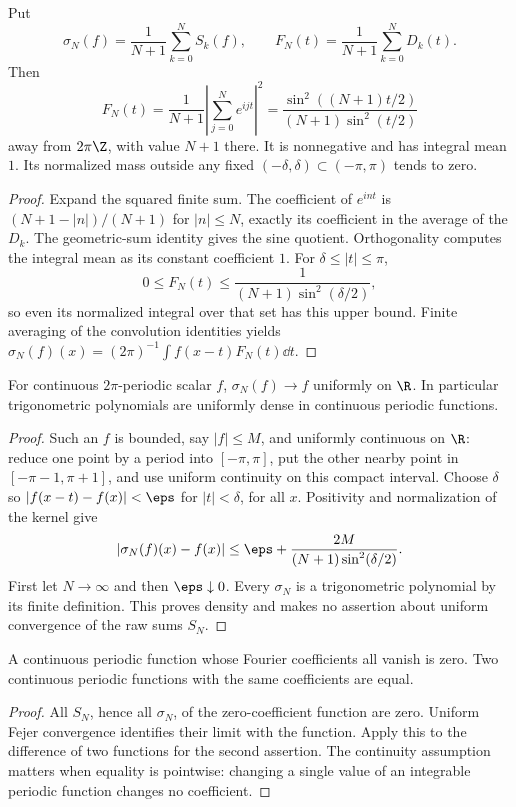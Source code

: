 \begin{construction}
Put
\[
 \sigma_N(f)=\frac1{N+1}\sum_{k=0}^N S_k(f),\qquad
 F_N(t)=\frac1{N+1}\sum_{k=0}^ND_k(t).
\]
Then
\[
 F_N(t)=\frac1{N+1}\left|\sum_{j=0}^Ne^{ijt}\right|^2
       =\frac{\sin^2((N+1)t/2)}{(N+1)\sin^2(t/2)}
\]
away from $2\pi\Z$, with value $N+1$ there. It is nonnegative and has
integral mean $1$. Its normalized mass outside any fixed
$(-\delta,\delta)\subset(-\pi,\pi)$ tends to zero.
\end{construction}
\begin{proof}
Expand the squared finite sum. The coefficient of $e^{int}$ is
$(N+1-|n|)/(N+1)$ for $|n|\leq N$, exactly its coefficient in the average
of the $D_k$. The geometric-sum identity gives the sine quotient.
Orthogonality computes the integral mean as its constant coefficient $1$.
For $\delta\leq|t|\leq\pi$,
\[
 0\leq F_N(t)\leq\frac1{(N+1)\sin^2(\delta/2)},
\]
so even its normalized integral over that set has this upper bound.
Finite averaging of the convolution identities yields
$\sigma_N(f)(x)=(2\pi)^{-1}\int f(x-t)F_N(t)\dd t$.
\end{proof}

\begin{theorem}
For continuous $2\pi$-periodic scalar $f$, $\sigma_N(f)\to f$ uniformly
on $\R$. In particular trigonometric polynomials are uniformly dense in
continuous periodic functions.
\end{theorem}
\begin{proof}
Such an $f$ is bounded, say $|f|\leq M$, and uniformly continuous on
$\R$: reduce one point by a period into $[-\pi,\pi]$, put the other
nearby point in $[-\pi-1,\pi+1]$, and use uniform continuity on this
compact interval. Choose $\delta$ so $|f(x-t)-f(x)|<\eps$ for
$|t|<\delta$, for all $x$. Positivity and normalization of the kernel give
\[
 |\sigma_N(f)(x)-f(x)|
 \leq\eps+\frac{2M}{(N+1)\sin^2(\delta/2)}.
\]
First let $N\to\infty$ and then $\eps\downarrow0$. Every $\sigma_N$ is a
trigonometric polynomial by its finite definition. This proves density
and makes no assertion about uniform convergence of the raw sums $S_N$.
\end{proof}

\begin{corollary}
A continuous periodic function whose Fourier coefficients all vanish is zero.
Two continuous periodic functions with the same coefficients are equal.
\end{corollary}
\begin{proof}
All $S_N$, hence all $\sigma_N$, of the zero-coefficient function are
zero. Uniform Fejer convergence identifies their limit with the function.
Apply this to the difference of two functions for the second assertion.
The continuity assumption matters when equality is pointwise: changing
a single value of an integrable periodic function changes no coefficient.
\end{proof}

